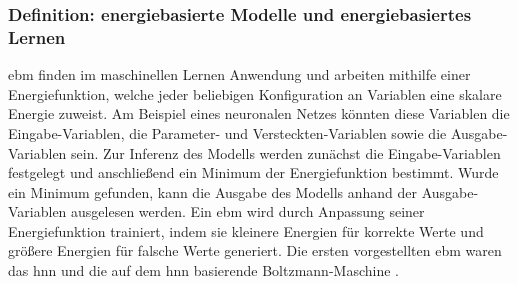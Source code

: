 \subsubsection{Definition: energiebasierte Modelle und energiebasiertes Lernen}

\ac{ebm} finden im maschinellen Lernen Anwendung und arbeiten mithilfe einer Energiefunktion, welche jeder beliebigen Konfiguration an Variablen eine skalare Energie zuweist. Am Beispiel eines neuronalen Netzes könnten diese Variablen die Eingabe-Variablen, die Parameter- und Versteckten-Variablen sowie die Ausgabe-Variablen sein. Zur Inferenz des Modells werden zunächst die Eingabe-Variablen festgelegt und anschließend ein Minimum der Energiefunktion bestimmt. Wurde ein Minimum gefunden, kann die Ausgabe des Modells anhand der Ausgabe-Variablen ausgelesen werden. Ein \ac{ebm} wird durch Anpassung seiner Energiefunktion trainiert, indem sie kleinere Energien für korrekte Werte und größere Energien für falsche Werte generiert. \cite{Lecun2006} Die ersten vorgestellten \ac{ebm} waren das \ac{hnn} \cite{Hopfield1984} und die auf dem \ac{hnn} basierende Boltzmann-Maschine \cite{Ackley1985}.

